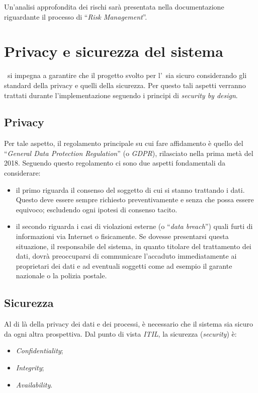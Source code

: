 	Un'analisi approfondita dei rischi sarà presentata nella documentazione riguardante il processo di ``\textit{Risk Management}''.

\newpage
\section{Privacy e sicurezza del sistema}

	\azienda~si impegna a garantire che il progetto svolto per l'\istituto~sia sicuro considerando gli standard della privacy e quelli della sicurezza.
	Per questo tali aspetti verranno trattati durante l'implementazione seguendo i principi di \textit{security by design}.

	\subsection{Privacy}
		
		Per tale aspetto, il regolamento principale su cui fare affidamento è quello del 
		``\textit{General Data Protection Regulation}'' (o \textit{GDPR}), rilasciato nella prima metà del 2018.
		Seguendo questo regolamento ci sono due aspetti fondamentali da considerare:
		\begin{itemize}
			
			\item il primo riguarda il consenso del soggetto di cui si stanno trattando i dati. 
			Questo deve essere sempre richiesto preventivamente e senza che possa essere equivoco;
			escludendo ogni ipotesi di consenso tacito.
			
			\item il secondo riguarda i casi di violazioni esterne (o ``\textit{data breach}'') quali furti di informazioni via Internet o fisicamente.
			Se dovesse presentarsi questa situazione, il responsabile del sistema, in quanto titolare del trattamento dei dati, dovrà preoccuparsi di communicare l'accaduto immediatamente ai proprietari dei dati e ad eventuali soggetti come ad esempio il garante nazionale o la polizia postale.
			
		\end{itemize}
		
	\subsection{Sicurezza}
	
		Al di là della privacy dei dati e dei processi, è necessario che il sistema sia sicuro da ogni altra prospettiva.
		Dal punto di vista \textit{ITIL}, la sicurezza (\textit{security}) è:
		\begin{itemize}[noitemsep]
			\item \textit{Confidentiality};
			\item \textit{Integrity};
			\item \textit{Availability}.
		\end{itemize}
	
